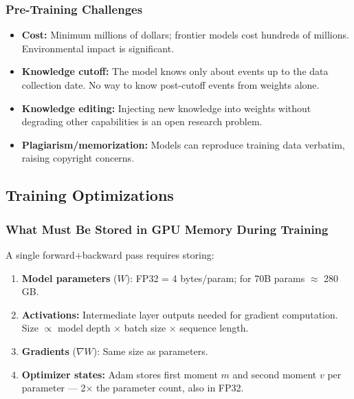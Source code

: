 \documentclass[11pt, a4paper]{article}
\begin{document}
\subsubsection{Pre-Training Challenges}

\begin{itemize}[leftmargin=2em]
  \item \textbf{Cost:} Minimum millions of dollars; frontier models cost hundreds of millions. Environmental impact is significant.
  \item \textbf{Knowledge cutoff:} The model knows only about events up to the data collection date. No way to know post-cutoff events from weights alone.
  \item \textbf{Knowledge editing:} Injecting new knowledge into weights without degrading other capabilities is an open research problem.
  \item \textbf{Plagiarism/memorization:} Models can reproduce training data verbatim, raising copyright concerns.
\end{itemize}

\subsection{Training Optimizations}

\subsubsection{What Must Be Stored in GPU Memory During Training}

A single forward+backward pass requires storing:
\begin{enumerate}[leftmargin=2em]
  \item \textbf{Model parameters} ($W$): FP32 = 4 bytes/param; for 70B params $\approx$ 280 GB.
  \item \textbf{Activations:} Intermediate layer outputs needed for gradient computation. Size $\propto$ model depth $\times$ batch size $\times$ sequence length.
  \item \textbf{Gradients} ($\nabla W$): Same size as parameters.
  \item \textbf{Optimizer states:} Adam stores first moment $m$ and second moment $v$ per parameter --- 2$\times$ the parameter count, also in FP32.
\end{enumerate}
\end{document}
